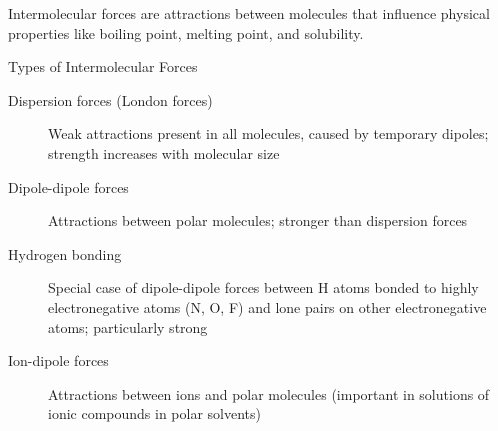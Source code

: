 Intermolecular forces are attractions between molecules that influence physical properties like boiling point, melting point, and solubility.

\begin{keyconcept}{Types of Intermolecular Forces}
\begin{description}
    \item[Dispersion forces (London forces)] Weak attractions present in all molecules, caused by temporary dipoles; strength increases with molecular size
    \item[Dipole-dipole forces] Attractions between polar molecules; stronger than dispersion forces
    \item[Hydrogen bonding] Special case of dipole-dipole forces between H atoms bonded to highly electronegative atoms (N, O, F) and lone pairs on other electronegative atoms; particularly strong
    \item[Ion-dipole forces] Attractions between ions and polar molecules (important in solutions of ionic compounds in polar solvents)
\end{description}
\end{keyconcept}


